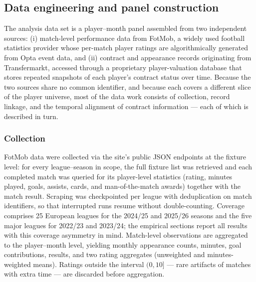 
\subsection{Data engineering and panel construction}
\label{sec:data-construction}

The analysis data set is a player--month panel assembled from two
independent sources: (i) match-level performance data from FotMob, a
widely used football statistics provider whose per-match player
ratings are algorithmically generated from Opta event data, and (ii)
contract and appearance records originating from Transfermarkt,
accessed through a proprietary player-valuation database that stores
repeated snapshots of each player's contract status over time.
Because the two sources share no common identifier, and because each
covers a different slice of the player universe, most of the data
work consists of collection, record linkage, and the temporal
alignment of contract information --- each of which is described in
turn.

\subsubsection*{Collection}

FotMob data were collected via the site's public JSON endpoints at
the fixture level: for every league--season in scope, the full
fixture list was retrieved and each completed match was queried for
its player-level statistics (rating, minutes played, goals, assists,
cards, and man-of-the-match awards) together with the match result.
Scraping was checkpointed per league with deduplication on match
identifiers, so that interrupted runs resume without double-counting.
Coverage comprises 25 European leagues for the 2024/25 and 2025/26
seasons and the five major leagues for 2022/23 and 2023/24; the
empirical sections report all results with this coverage asymmetry in
mind. Match-level observations are aggregated to the player--month
level, yielding monthly appearance counts, minutes, goal
contributions, results, and two rating aggregates (unweighted and
minutes-weighted means). Ratings outside the interval $(0,10]$ ---
rare artifacts of matches with extra time --- are discarded before
aggregation.


